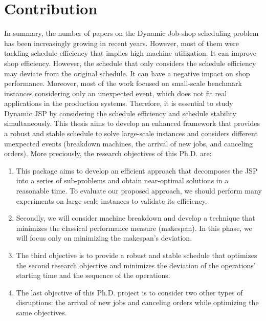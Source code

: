 \documentclass{article}
\begin{document}
\section{Contribution}
In summary, the number of papers on the Dynamic Job-shop scheduling problem has been increasingly growing in recent years. However, most of them were tackling schedule efficiency that implies high machine utilization. It can improve shop efficiency. However, the schedule that only considers the schedule efficiency may deviate from the original schedule. It can have a negative impact on shop performance.
Moreover, most of the work focused on small-scale benchmark instances considering only an unexpected event, which does not fit real applications in the production systems. Therefore, it is essential to study Dynamic JSP by considering the schedule efficiency and schedule stability simultaneously. This thesis aims to develop an enhanced framework that provides a robust and stable schedule to solve large-scale instances and considers different unexpected events (breakdown machines, the arrival of new jobs, and canceling orders). 
More preciously, the research objectives of this Ph.D. are:
\begin{enumerate}
    \item This package aims to develop an efficient approach that decomposes the JSP into a series of sub-problems and obtain near-optimal solutions in a reasonable time. To evaluate our proposed approach, we should perform many experiments on large-scale instances to validate its efficiency.
    \item Secondly, we will consider machine breakdown and develop a technique that minimizes the classical performance measure (makespan). In this phase, we will focus only on minimizing the makespan's deviation.
    \item The third objective is to provide a robust and stable schedule that optimizes the second research objective and minimizes the deviation of the operations' starting time and the sequence of the operations.
    \item The last objective of this Ph.D. project is to consider two other types of disruptions: the arrival of new jobs and canceling orders while optimizing the same objectives.
\end{enumerate}
\end{document}
